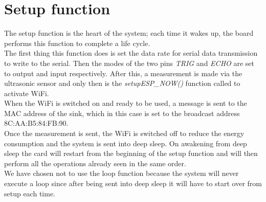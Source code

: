 \section{Setup function}
The setup function is the heart of the system; each time it wakes up, the board performs this function to complete a life cycle.\\
The first thing this function does is set the data rate for serial data transmission to write to the serial.
Then the modes of the two pins \textit{TRIG} and \textit{ECHO} are set to output and input respectively.
After this, a measurement is made via the ultrasonic sensor and only then is the \textit{setupESP\_NOW()} function called to activate WiFi.\\
When the WiFi is switched on and ready to be used, a message is sent to the MAC address of the sink, which in this case is set to the broadcast address 8C:AA:B5:84:FB:90.\\
Once the measurement is sent, the WiFi is switched off to reduce the energy consumption and the system is sent into deep sleep.
On awakening from deep sleep the card will restart from the beginning of the setup function and will then perform all the operations already seen in the same order.\\
We have chosen not to use the loop function because the system will never execute a loop since after being sent into deep sleep it will have to start over from setup each time.







